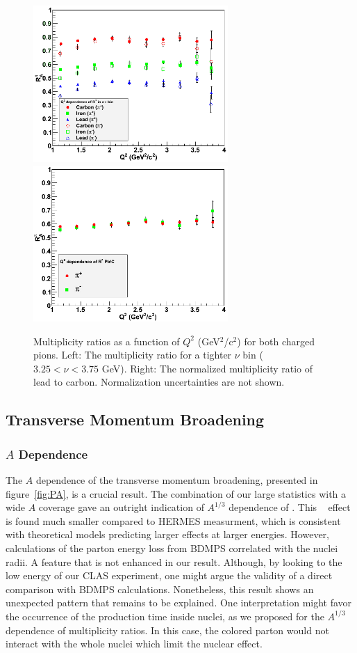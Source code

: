 \begin{figure}[tbp]
\centering
\includegraphics[width=7.4cm] {chap6-fig/F_RvQ2inNu.png} 
\includegraphics[width=7.4cm] {chap6-fig/F_RvQ2_PbC.png} 
\caption {Multiplicity ratios as a function of $Q^2$ (GeV$^2$/c$^2$) for both charged pions. Left: The multiplicity ratio for a tighter $\nu$ bin ($3.25 < \nu < 3.75$ GeV). Right: The normalized multiplicity ratio of lead to carbon. Normalization uncertainties are not shown.}
\label{fig:RQ2Detailed}
\end{figure}

\subsection{Transverse Momentum Broadening}

\subsubsection{$A$ Dependence}

The $A$ dependence of the transverse momentum broadening, presented in 
figure~\ref{fig:PA}, is a crucial result. The combination of our large statistics with a wide $A$ coverage gave an outright indication of $A^{1/3}$ dependence of \dpt. This \dptp~ effect is found much smaller compared to HERMES measurment\cite{Airapetian:2009jy}, which is consistent with theoretical models predicting larger effects at larger energies. However, calculations of the parton energy loss from BDMPS \cite{Baier:1996sk} correlated \pt with the nuclei radii. A feature that is not enhanced in our result. Although, by looking to the low energy of our CLAS experiment, one might argue the validity of a direct comparison with BDMPS calculations. Nonetheless, this result shows an unexpected pattern that remains to be explained. One interpretation might favor the occurrence of the production time inside nuclei, as we proposed for the $A^{1/3}$ dependence of multiplicity ratios. In this case, the colored parton would not interact with the whole nuclei which limit the nuclear effect.

